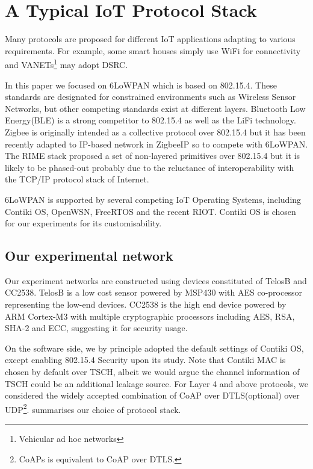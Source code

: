 \section{A Typical IoT Protocol Stack}
Many protocols are proposed for different IoT applications adapting to various requirements. For example, some smart houses simply use WiFi for connectivity and VANETs\footnote{Vehicular ad hoc networks} may adopt DSRC\cite{DSRC}. 

In this paper we focused on 6LoWPAN\cite{rfc4944} which is based on 802.15.4\cite{802154}. These standards are designated for constrained environments such as Wireless Sensor Networks,  but other competing standards exist at different layers. Bluetooth Low Energy(BLE)\cite{BLE} is a strong competitor to 802.15.4 as well as the LiFi\cite{LiFi} technology. Zigbee\cite{Zigbee} is originally intended as a collective protocol over 802.15.4 but it has been recently adapted to IP-based network in ZigbeeIP\cite{ZigbeeIp} so to compete with 6LoWPAN. The RIME stack\cite{RIME} proposed a set of non-layered primitives over 802.15.4 but it is likely to be phased-out probably due to the reluctance of interoperability with the TCP/IP protocol stack of Internet. 

6LoWPAN is supported by several competing IoT Operating Systems, including Contiki OS\cite{Contiki}, OpenWSN\cite{OpenWSN}, FreeRTOS\cite{FreeRTOS} and the recent RIOT\cite{RIOT}. Contiki OS is chosen for our experiments for its customisability.

\subsection{Our experimental network}
Our experiment networks are constructed using devices constituted of TelosB\cite{TelosB} and CC2538\cite{CC2538}. TelosB is a low cost sensor powered by MSP430 with AES co-processor representing the low-end devices. CC2538 is the high end device powered by ARM Cortex-M3 with multiple cryptographic processors including AES, RSA, SHA-2 and ECC, suggesting it for security usage.

On the software side, we by principle adopted the default settings of Contiki OS, except enabling 802.15.4 Security\cite{802154} upon its study. Note that Contiki MAC\cite{ContikiMAC} is chosen by default over TSCH\cite{TSCH}, albeit we would argue the channel information of TSCH could be an additional leakage source. For Layer 4\cite{OSI} and above protocols, we considered the widely accepted combination of CoAP\cite{rfc7252} over DTLS\cite{rfc6347}(optional) over UDP\cite{rfc768}\footnote{CoAPs is equivalent to CoAP over DTLS.}.  summarises our choice of protocol stack.

